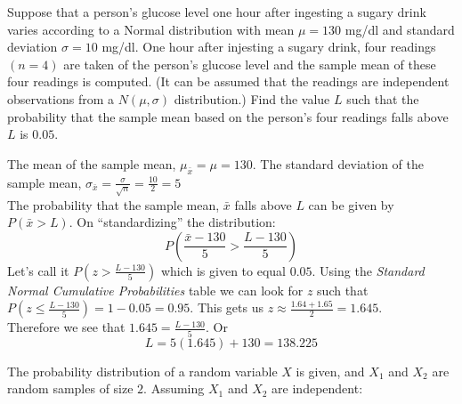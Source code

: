 \documentclass[boxes, qed]{homework}
\begin{document}
\begin{problem}Suppose that a person’s glucose level one hour after 
  ingesting a sugary drink varies according to a Normal distribution 
  with mean $\mu=130$ mg/dl and standard deviation $\sigma=10$ mg/dl. 
  One hour after injesting a sugary drink, four readings $(n=4)$ are taken of 
  the person’s glucose level and the sample mean of these four readings 
  is computed. (It can be assumed that the readings are independent observations from
  a $N(\mu,\sigma)$ distribution.) Find the value $L$ such that the 
  probability that the sample mean based on the person’s four readings
  falls above $L$ is $0.05$.
\end{problem}
\begin{solution}The mean of the sample mean, $\mu_{\bar{x}}=\mu=130$.
  The standard deviation of the sample mean, 
  $\sigma_{\bar{x}}=\frac{\sigma}{\sqrt{n}}=\frac{10}{2}=5$\\

  The probability that the sample mean, $\bar{x}$ falls above $L$
  can be given by $P(\bar{x}>L)$. On ``standardizing'' the distribution:
  $$P(\frac{\bar{x}-130}{5}>\frac{L-130}{5})$$
  Let's call it $P(z>\frac{L-130}{5})$ which is given to equal $0.05$.
  Using the \textit{Standard Normal Cumulative Probabilities} table
  we can look for $z$ such that $P(z\le\frac{L-130}{5})=1-0.05=0.95$. 
  This gets us $z\approx\frac{1.64+1.65}{2}=1.645$.\\

  Therefore we see that $1.645={\frac{L-130}{5}}$. Or
  $$L={5(1.645)+130=\boxed{138.225}}$$
\end{solution}
\begin{problem}The probability distribution of a random variable
  $X$ is given, and $X_1$ and $X_2$ are random samples of size $2$.
  Assuming $X_1$ and $X_2$ are independent:
\end{problem}
\end{document}
